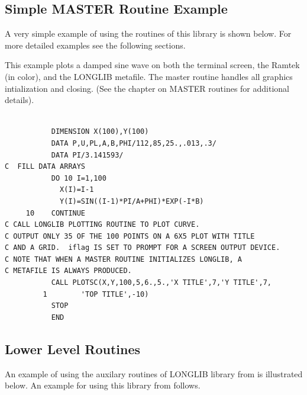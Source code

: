 \documentclass[11pt]{report}
\begin{document}
\subsection{Simple MASTER Routine Example}

A very simple example of using the  routines of this library
is shown below.  For more detailed examples see the following
sections.

This example plots a damped sine wave on both the terminal screen, the
Ramtek (in color), and the LONGLIB metafile.  The master
routine  handles all graphics intialization and closing.
(See the chapter on MASTER routines for additional details).

\begin{verbatim}

           DIMENSION X(100),Y(100)
           DATA P,U,PL,A,B,PHI/112,85,25.,.013,.3/
           DATA PI/3.141593/
C  FILL DATA ARRAYS
           DO 10 I=1,100
             X(I)=I-1
             Y(I)=SIN((I-1)*PI/A+PHI)*EXP(-I*B)
     10    CONTINUE
C CALL LONGLIB PLOTTING ROUTINE TO PLOT CURVE.
C OUTPUT ONLY 35 OF THE 100 POINTS ON A 6X5 PLOT WITH TITLE
C AND A GRID.  iflag IS SET TO PROMPT FOR A SCREEN OUTPUT DEVICE.
C NOTE THAT WHEN A MASTER ROUTINE INITIALIZES LONGLIB, A
C METAFILE IS ALWAYS PRODUCED.
           CALL PLOTSC(X,Y,100,5,6.,5.,'X TITLE',7,'Y TITLE',7,
         1        'TOP TITLE',-10)
           STOP
           END

\end{verbatim}

\subsection{Lower Level Routines}

An example of using the auxilary routines of LONGLIB library from
 is illustrated below.
An example for using this library from  follows.
\end{document}
